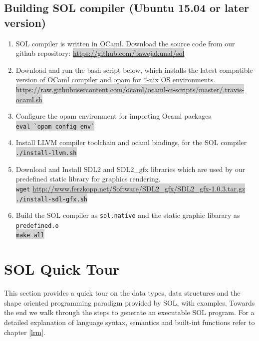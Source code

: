 \documentclass[letterpaper,12pt]{report}
\begin{document}
    \subsection{Building SOL compiler (Ubuntu 15.04 or later version)}
    \begin{enumerate}
      \item SOL compiler is written in OCaml. Download the source code from our github repository: \colorbox{lightgray}{{\href{https://github.com/bawejakunal/sol}{https://github.com/bawejakunal/sol}}}

      \item Download and run the bash script below, which installs the latest compatible version of OCaml compiler and opam for *-nix OS environments.\\
      \colorbox{lightgray}{{\href{https://raw.githubusercontent.com/ocaml/ocaml-ci-scripts/master/.travis-ocaml.sh}{https://raw.githubusercontent.com/ocaml/ocaml-ci-scripts/master/.travis-ocaml.sh}}}

      \item Configure the opam environment for importing Ocaml packages\\
      \colorbox{lightgray}{\lstinline[style=bash]{eval `opam config env`}}

      \item Install LLVM compiler toolchain and ocaml bindings, for the SOL compiler\\
      \colorbox{lightgray}{\lstinline[style=bash]{./install-llvm.sh}}

      \item Download and Install SDL2 and SDL2\_gfx libraries which are used by our predefined static library for graphics rendering.\\
        \colorbox{lightgray}{\lstinline[style=bash]{wget} \href{http://www.ferzkopp.net/Software/SDL2\_gfx/SDL2\_gfx-1.0.3.tar.gz}{http://www.ferzkopp.net/Software/SDL2\_gfx/SDL2\_gfx-1.0.3.tar.gz}}\\
        \colorbox{lightgray}{\lstinline[style=bash]{./install-sdl-gfx.sh}}

      \item Build the SOL compiler as \texttt{sol.native} and the static graphic libarary as \texttt{predefined.o}\\
      \colorbox{lightgray}{\lstinline[style=bash]{make all}}

    \end{enumerate}

  \section{SOL Quick Tour}
  This section provides a quick tour on the data types, data structures and the shape oriented programming paradigm provided by SOL, with examples. Towards the end we walk through the steps to generate an executable SOL program. For a detailed explanation of language syntax, semantics and built-int functions refer to chapter \ref{lrm}.
\end{document}
